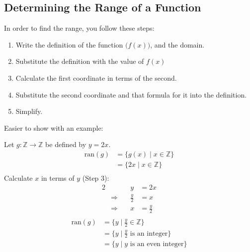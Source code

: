 \documentclass[../notes.tex]{subfiles}
\begin{document}
			\subsection{Determining the Range of a Function}
				In order to find the range, you follow these steps:
				\begin{enumerate}
					\item Write the definition of the function $\bigl(f(x)\bigr)$, and the domain.
					\item Substitute the definition with the value of $f(x)$
					\item Calculate the first coordinate in terms of the second.
					\item Substitute the second coordinate and that formula for it into the definition.
					\item Simplify.
				\end{enumerate}
				\pagebreak
				Easier to show with an example:
				\begin{example}[width=0.8\textwidth]
					Let $g: \mathbb{Z} \rightarrow \mathbb{Z}$ be defined by $y = 2x$.
					\begin{align*}
						\mathrm{ran}(g) &= \{g(x) \mid x \in \mathbb{Z}\}\tag*{$(1)$}\\
						&= \{2x \mid x \in \mathbb{Z}\}\tag*{$(2)$}\\
					\end{align*}
					Calculate $x$ in terms of $y$ (Step $3$):
					\begin{alignat*}{2}
						& \qquad &y &= 2x\\
						& \Rightarrow \quad &\frac{y}{2} &= x\\
						& \Rightarrow \quad &x &= \frac{y}{2}\\
					\end{alignat*}
					\begin{align*}
						\mathrm{ran}(g) &= \{y \mid \frac{y}{2} \in \mathbb{Z}\}\tag*{$(4)$}\\
						&= \{y \mid \frac{y}{2} \text{ is an integer}\}\tag*{$(5)$}\\
						&= \{y \mid y \text{ is an even integer}\}
					\end{align*}
				\end{example}
\end{document}
